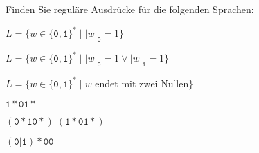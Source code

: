 Finden Sie reguläre Ausdrücke für die folgenden Sprachen:
\begin{teilaufgaben}
\item
$L=\{w\in\{\texttt{0},\texttt{1}\}^*\mid |w|_{\texttt{0}}=1\}$
\item
$L=\{w\in\{\texttt{0},\texttt{1}\}^*\mid |w|_{\texttt{0}}=1\vee |w|_{\texttt{1}}=1\}$
\item
$L=\{w\in\{\texttt{0},\texttt{1}\}^*\mid \text{$w$ endet mit zwei Nullen}\}$
\end{teilaufgaben}

\begin{loesung}
\begin{teilaufgaben}
\item $\texttt{1}{*}\texttt{0}\texttt{1}*$
\item $
(\texttt{0}{*}\texttt{1}\texttt{0}*)|(\texttt{1}{*}\texttt{0}\texttt{1}*)
$
\item $(\texttt{0}|\texttt{1}){*}\texttt{00}$
\qedhere
\end{teilaufgaben}
\end{loesung}
